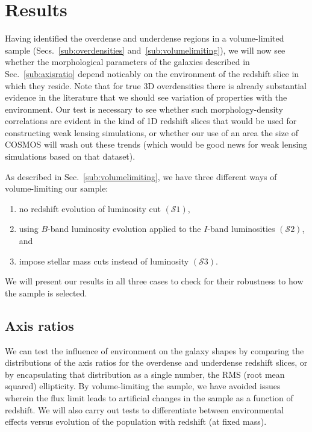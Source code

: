 \documentclass[twocolumn,useAMS,usenatbib]{mn2e}
\newcommand{\s}{\ensuremath{\mathcal{S}}}
\begin{document}
																																																																																																																																																																																																																																																																																																																																																											

\section{Results}
\label{S:results}

Having identified the overdense and underdense regions in a
volume-limited sample (Secs.~\ref{sub:overdensities}
and~\ref{sub:volumelimiting}), we will now see whether the morphological
parameters of the galaxies described in Sec.~\ref{sub:axisratio}
depend noticably on the environment of the redshift slice in which
they reside. Note that for true 3D overdensities there is already
substantial evidence in the literature that we should see variation of
properties with the environment.  Our test is necessary to see
whether such morphology-density correlations are evident in the kind
of 1D redshift slices that would be used for constructing weak lensing
simulations, or whether our use of an area the size of COSMOS will
wash out these trends (which would be good news for weak lensing
simulations based on that dataset).

As described in Sec.~\ref{sub:volumelimiting}, we have three different ways of volume-limiting our sample:
\begin{enumerate}
 \item no redshift evolution of luminosity cut $(\s1)$,
 \item using $B$-band luminosity evolution applied to the $I$-band
   luminosities $(\s2)$, and
 \item impose stellar mass cuts instead of luminosity $(\s3)$.
\end{enumerate}

We will present our results in all three cases to check for their
robustness to how the sample is selected. 

\subsection{Axis ratios} 

We can test the influence of environment on the galaxy shapes by
comparing the distributions of the axis ratios for the overdense and
underdense redshift slices, or by encapsulating that distribution as a
single number, the RMS (root mean squared) ellipticity. By
volume-limiting the sample, we have avoided issues
wherein the flux limit leads to artificial changes in the sample as a
function of redshift.  We will also carry out tests to differentiate
between environmental effects versus evolution of the population with
redshift (at fixed mass).
\end{document}

